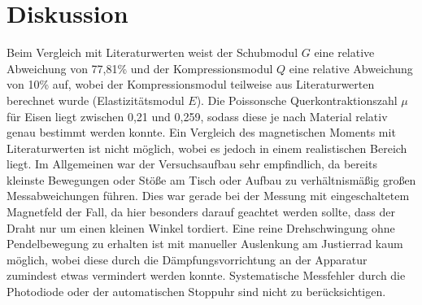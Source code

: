 \section{Diskussion}
\label{sec:Diskussion}

Beim Vergleich mit Literaturwerten weist der Schubmodul $G$ eine relative Abweichung von 77,81\% und
der Kompressionsmodul $Q$ eine relative Abweichung von 10\% auf, wobei der Kompressionsmodul teilweise
aus Literaturwerten berechnet wurde (Elastizitätsmodul $E$). Die Poissonsche Querkontraktionszahl $\mu$
für Eisen liegt zwischen 0,21 und 0,259, sodass diese je nach Material relativ genau bestimmt
werden konnte. Ein Vergleich des magnetischen Moments
mit Literaturwerten ist nicht möglich, wobei es jedoch in einem realistischen Bereich liegt.
Im Allgemeinen war der Versuchsaufbau sehr empfindlich, da bereits kleinste Bewegungen oder Stöße
am Tisch oder Aufbau zu verhältnismäßig großen Messabweichungen führen. Dies war gerade bei der
Messung mit eingeschaltetem Magnetfeld der Fall, da hier besonders darauf geachtet werden sollte,
dass der Draht nur um einen kleinen Winkel tordiert. Eine reine Drehschwingung ohne Pendelbewegung
zu erhalten ist mit manueller Auslenkung am Justierrad kaum möglich, wobei diese durch die Dämpfungsvorrichtung an 
der Apparatur zumindest etwas vermindert werden konnte. Systematische Messfehler durch die Photodiode oder
der automatischen Stoppuhr sind nicht zu berücksichtigen.